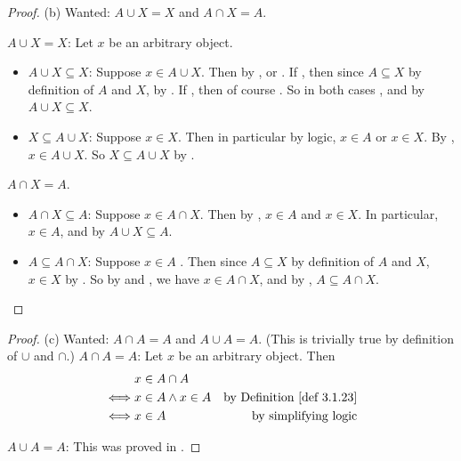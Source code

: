 \begin{proof}{(b)} Wanted: \(A \cup X = X\) and \(A \cap X = A\).

\(A \cup X = X\): Let \(x\) be an arbitrary object.
\begin{itemize}
    \item \(A \cup X \subseteq X\): Suppose \(x \in A \cup X\). Then by ,  or . If , then since \(A \subseteq X\) by definition of \(A\) and \(X\),  by . If , then of course . So in both cases , and by  \(A \cup X \subseteq X\).
    \item \(X \subseteq A \cup X\): Suppose \(x \in X\). Then in particular by logic, \(x \in A\) or \(x \in X\). By , \(x \in A \cup X\). So \(X \subseteq A \cup X\) by .
\end{itemize}

\(A \cap X = A\).
\begin{itemize}
    \item \(A \cap X \subseteq A\): Suppose \(x \in A \cap X\). Then by , \(x \in A\) and \(x \in X\). In particular, \(x \in A\),  and by  \(A \cup X \subseteq A\).
    \item \(A \subseteq A \cap X\): Suppose \(x \in A\) . Then since \(A \subseteq X\) by definition of \(A\) and \(X\), \(x \in X\)  by . So by  and , we have \(x \in A \cap X\), and by , \(A \subseteq A \cap X\).
\end{itemize}
\end{proof}

\begin{proof}{(c)} Wanted: \(A \cap A = A\) and \(A \cup A = A\). (This is trivially true by definition of \(\cup\) and \(\cap\).)
\(A \cap A = A\): Let \(x\) be an arbitrary object. Then
\begin{align*}
         & x \in A \cap A \\
    \iff & x \in A \land x \in A & \text{by \DEF{3.1.23}} \\
    \iff & x \in A & \text{by simplifying logic}
\end{align*}

\(A \cup A = A\): This was proved in .
\end{proof}

